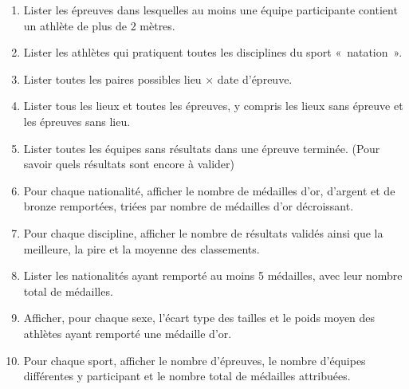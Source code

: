 \begin{enumerate}[itemsep=0pt]
  \item Lister les épreuves dans lesquelles au moins une équipe participante contient un athlète de plus de 2 mètres.

  \item Lister les athlètes qui pratiquent toutes les disciplines du sport «~natation~».

  \item Lister toutes les paires possibles lieu $\times$ date d'épreuve.

  \item Lister tous les lieux et toutes les épreuves, y compris les lieux sans épreuve et les épreuves sans lieu.
  
  \item Lister toutes les équipes sans résultats dans une épreuve terminée. (Pour savoir quels résultats sont encore à valider)

  \item Pour chaque nationalité, afficher le nombre de médailles d'or, d'argent et de bronze remportées, triées par nombre de médailles d'or décroissant.

  \item Pour chaque discipline, afficher le nombre de résultats validés ainsi que la meilleure, la pire et la moyenne des classements.

  \item Lister les nationalités ayant remporté au moins 5 médailles, avec leur nombre total de médailles.

  \item Afficher, pour chaque sexe, l'écart type des tailles et le poids moyen des athlètes ayant remporté une médaille d'or.

  \item Pour chaque sport, afficher le nombre d'épreuves, le nombre d'équipes différentes y participant et le nombre total de médailles attribuées.
\end{enumerate}